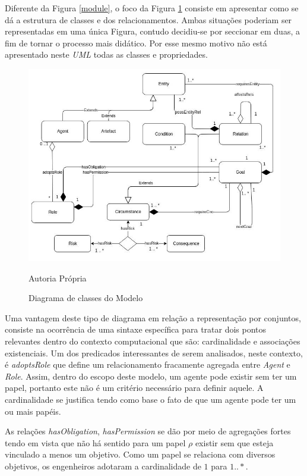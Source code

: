 Diferente da Figura \ref{module}, o foco da Figura \ref{classdiagrama} consiste em apresentar como se dá a estrutura de classes e dos relacionamentos. Ambas situações poderiam ser representadas em uma única Figura, contudo decidiu-se por seccionar em duas, a fim de tornar o processo mais didático. Por esse mesmo motivo não está apresentado neste \textit{UML} todas as classes e propriedades.  

\begin{figure}[H]
  \centering
  \caption{Diagrama de classes do Modelo}
  \includegraphics[width=1\linewidth]{figure/Class.jpg} 
  \begin{center}
  	Autoria Própria
  \end{center}
  \label{classdiagrama}
\end{figure}

Uma vantagem deste tipo de diagrama em relação a representação por conjuntos, consiste na ocorrência de uma sintaxe específica para tratar dois pontos relevantes dentro do contexto computacional que são: cardinalidade e associações existenciais. Um dos predicados interessantes de serem analisados, neste contexto, é \textit{adoptsRole} que define um relacionamento fracamente agregada entre \textit{Agent} e \textit{Role}. Assim, dentro do escopo deste modelo, um agente pode existir sem ter um papel, portanto este não é um critério necessário para definir aquele. A cardinalidade se justifica tendo como base o fato de que um agente pode ter um ou mais papéis. 

As relações \textit{hasObligation}, \textit{hasPermission} se dão por meio de agregações fortes tendo em vista que não há sentido para um papel $\rho$ existir sem que esteja vinculado a menos um objetivo. Como um papel se relaciona com diversos objetivos, os engenheiros adotaram a cardinalidade de $1$ para $1 .. *$.

